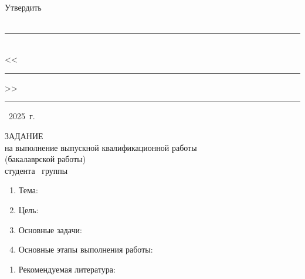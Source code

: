 \thispagestyle{empty}
\begingroup
\OnehalfSpacing
\setlength{\parindent}{0pt}
\begin{center}
\vkrUniversityType\\
\vkrUniversityLevel\\
\vkrUniversityName\\
\vkrInstitute\\
\vkrDepartment
\end{center}

\vspace{0.6cm}

\begin{flushright}
\begin{minipage}{0.45\textwidth}
Утвердить\\
\vkrDepartmentHeadTitle\\
\rule{3cm}{0.4pt}~\vkrDepartmentHeadShort\\
<<\rule{0.7cm}{0.4pt}>>~\rule{3cm}{0.4pt}~2025~г.
\end{minipage}
\end{flushright}

\vspace{0.6cm}

\begin{center}
ЗАДАНИЕ\\
на выполнение выпускной квалификационной работы\\
(бакалаврской работы)\\[0.5cm]
студента \vkrStudentFullName\ группы \vkrStudentGroup
\end{center}

\begin{enumerate}[leftmargin=*, label=\arabic*.]
    \item Тема: \vkrTitle
    \item Цель: \vkrAssignmentGoal
    \item Основные задачи:
    \begin{enumerate}[label=\asbuk*)]
        \vkrAssignmentTasks
    \end{enumerate}
    \item Основные этапы выполнения работы:
    \begin{enumerate}[label=\asbuk*)]
        \vkrAssignmentStages
    \end{enumerate}
\end{enumerate}
\endgroup
\clearpage

\thispagestyle{empty}
\begingroup
\OnehalfSpacing
\setlength{\parindent}{0pt}
\begin{enumerate}[leftmargin=*, label=\arabic*., start=5]
    \item Рекомендуемая литература:
    \begin{enumerate}[label=\arabic*)]
        \vkrAssignmentLiterature
    \end{enumerate}
\end{enumerate}

